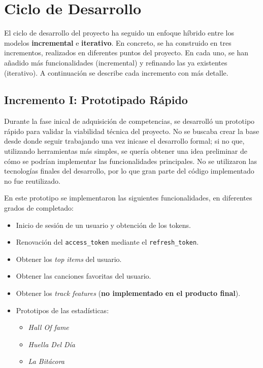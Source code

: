 \section{Ciclo de Desarrollo}

El ciclo de desarrollo del proyecto ha seguido un enfoque híbrido entre los modelos \textbf{incremental} e \textbf{iterativo}. En concreto, se ha construido en tres incrementos, realizados en diferentes puntos del proyecto. En cada uno, se han añadido más funcionalidades (incremental) y refinando las ya existentes (iterativo). A continuación se describe cada incremento con más detalle.

\subsection*{Incremento I: Prototipado Rápido}

Durante la fase inical de adquisición de competencias, se desarrolló un prototipo rápido para validar la viabilidad técnica del proyecto. No se buscaba crear la base desde donde seguir trabajando una vez inicase el desarrollo formal; si no que, utilizando herramientas más simples, se quería obtener una idea preliminar de cómo se podrían implementar las funcionalidades principales. No se utilizaron las tecnologías finales del desarrollo, por lo que gran parte del código implementado no fue reutilizado.

En este prototipo se implementaron las siguientes funcionalidades, en diferentes grados de completado:
\setlength{\itemsep}{0pt}
\begin{itemize}
    \item Inicio de sesión de un usuario y obtención de los tokens.
    \item Renovación del \texttt{access\_token} mediante el \texttt{refresh\_token}.
    \item Obtener los \textit{top items} del usuario.
    \item Obtener las canciones favoritas del usuario.
    \item Obtener los \textit{track features} (\textbf{no implementado en el producto final}).
    \item Prototipos de las estadísticas:
          \begin{itemize}
              \item \textit{Hall Of fame}
              \item \textit{Huella Del Día}
              \item \textit{La Bitácora}
          \end{itemize}
\end{itemize}

